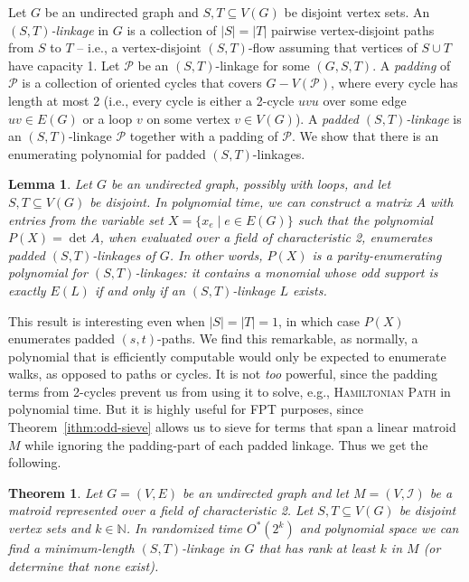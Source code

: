 \documentclass[10pt,a4paper]{article}
\newtheorem{theorem}{Theorem}[section]
\newtheorem{lemma}{Lemma}[section]
\newcommand{\N}{\ensuremath{\mathbb N}\xspace}
\newcommand{\cI}{\ensuremath{\mathcal I}\xspace}
\newcommand{\cP}{\ensuremath{\mathcal P}\xspace}
\begin{document}
Let $G$ be an undirected graph and $S, T \subseteq V(G)$ be disjoint
vertex sets. An \emph{$(S,T)$-linkage} in $G$ is a collection of
$|S|=|T|$ pairwise vertex-disjoint paths from $S$ to $T$ -- i.e., a
vertex-disjoint $(S,T)$-flow assuming that vertices of $S \cup T$ 
have capacity 1. Let $\cP$ be an $(S,T)$-linkage for some $(G, S, T)$.
A \emph{padding} of $\cP$ is a collection of oriented cycles that
covers $G-V(\cP)$, where every cycle has length at most 2 (i.e., every
cycle is either a 2-cycle $uvu$ over some edge $uv \in E(G)$
or a loop $v$ on some vertex $v \in V(G)$). 
A \emph{padded $(S,T)$-linkage} is an $(S,T)$-linkage $\cP$ together with a padding of $\cP$.
We show that there is an enumerating polynomial for padded $(S,T)$-linkages. 

\begin{lemma}
  Let $G$ be an undirected graph, possibly with loops,
  and let $S, T \subseteq V(G)$ be disjoint.
  In polynomial time, we can construct a matrix $A$ with entries from the variable set $X= \{x_e \mid e \in E(G) \}$ such that the polynomial $P(X)=\det A$, when evaluated over a field of characteristic 2, enumerates padded $(S,T)$-linkages of $G$.
  In other words, $P(X)$ is a parity-enumerating polynomial for $(S,T)$-linkages: it contains a monomial whose odd support is exactly $E(L)$ if and only if an $(S,T)$-linkage $L$ exists.
\end{lemma}

This result is interesting even when $|S|=|T|=1$, in which case $P(X)$
enumerates padded $(s,t)$-paths. We find this remarkable, as normally,
a polynomial that is efficiently computable would only be expected to
enumerate walks, as opposed to paths or cycles. It is not \emph{too}
powerful, since the padding terms from 2-cycles prevent us from 
using it to solve, e.g., \textsc{Hamiltonian Path} in polynomial time.
But it is highly useful for FPT purposes, since Theorem~\ref{ithm:odd-sieve}
allows us to sieve for terms that span a linear matroid $M$ while ignoring the
padding-part of each padded linkage. Thus we get the following.

\begin{theorem} \label{ithm:linkage}
  Let $G=(V,E)$ be an undirected graph and
  let $M=(V,\cI)$ be a matroid represented over a field of characteristic 2.
  Let $S, T \subseteq V(G)$ be disjoint vertex sets and $k \in \N$.
  In randomized time $O^*(2^k)$ and polynomial space we can find a
  minimum-length $(S,T)$-linkage in $G$ that has rank at least $k$ in
  $M$ (or determine that none exist).  
\end{theorem}
\end{document}
